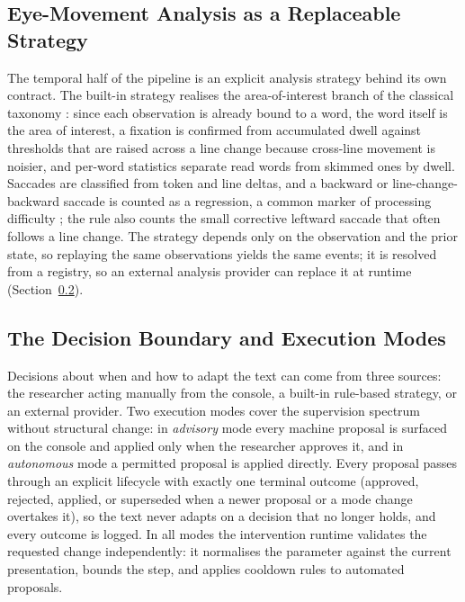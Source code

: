 \subsection{Eye-Movement Analysis as a Replaceable Strategy}
\label{sec:platform-analysis}

The temporal half of the pipeline is an explicit analysis strategy behind its own contract.
The built-in strategy realises the area-of-interest branch of the classical taxonomy \cite{salvucci2000identifying}: since each observation is already bound to a word, the word itself is the area of interest, a fixation is confirmed from accumulated dwell against thresholds that are raised across a line change because cross-line movement is noisier, and per-word statistics separate read words from skimmed ones by dwell.
Saccades are classified from token and line deltas, and a backward or line-change-backward saccade is counted as a regression, a common marker of processing difficulty \cite{rayner1998eyemovements}; the rule also counts the small corrective leftward saccade that often follows a line change.
The strategy depends only on the observation and the prior state, so replaying the same observations yields the same events; it is resolved from a registry, so an external analysis provider can replace it at runtime (Section~\ref{sec:platform-decision}).

\subsection{The Decision Boundary and Execution Modes}
\label{sec:platform-decision}

Decisions about when and how to adapt the text can come from three sources: the researcher acting manually from the console, a built-in rule-based strategy, or an external provider.
Two execution modes cover the supervision spectrum without structural change: in \emph{advisory} mode every machine proposal is surfaced on the console and applied only when the researcher approves it, and in \emph{autonomous} mode a permitted proposal is applied directly.
Every proposal passes through an explicit lifecycle with exactly one terminal outcome (approved, rejected, applied, or superseded when a newer proposal or a mode change overtakes it), so the text never adapts on a decision that no longer holds, and every outcome is logged.
In all modes the intervention runtime validates the requested change independently: it normalises the parameter against the current presentation, bounds the step, and applies cooldown rules to automated proposals.

